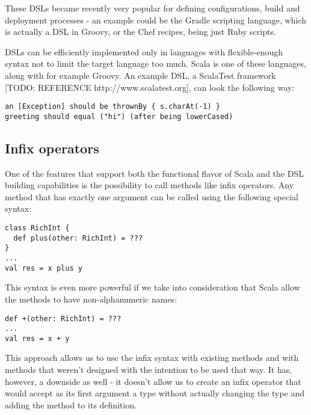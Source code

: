 These DSLs became recently very popular for defining configurations, build and deployment processes - an example could be the Gradle scripting language, which is actually a DSL in Groovy, or the Chef recipes, being just Ruby scripts.

DSLs can be efficiently implemented only in languages with flexible-enough syntax not to limit the target language too much. Scala is one of these languages, along with for example Groovy. An example DSL, a ScalaTest framework [TODO: REFERENCE http://www.scalatest.org], can look the following way:

\lstset{style=Scala}
\begin{lstlisting}
an [Exception] should be thrownBy { s.charAt(-1) }
greeting should equal ("hi") (after being lowerCased)
\end{lstlisting}



\subsection{Infix operators}
\label{subsec:infixops}

One of the features that support both the functional flavor of Scala and the DSL building capabilities is the possibility to call methods like infix operators. Any method that has exactly one argument can be called using the following special syntax:

\lstset{style=Scala}
\begin{lstlisting}
class RichInt {
  def plus(other: RichInt) = ???
}
...
val res = x plus y
\end{lstlisting}

This syntax is even more powerful if we take into consideration that Scala allow the methods to have non-alphanumeric names:

\lstset{style=Scala}
\begin{lstlisting}
def +(other: RichInt) = ???
...
val res = x + y
\end{lstlisting}

This approach allows us to use the infix syntax with existing methods and with methods that weren't designed with the intention to be used that way. It has, however, a downside as well - it doesn't allow us to create an infix operator that would accept as its first argument a type without actually changing the type and adding the method to its definition. 

